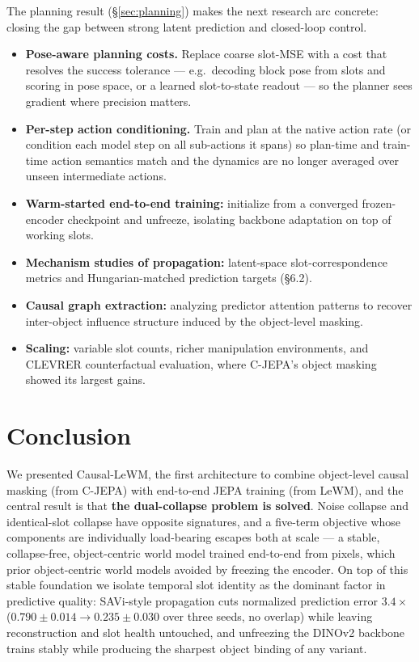 \documentclass[12pt]{article}
\begin{document}
The planning result (\S\ref{sec:planning}) makes the next research arc concrete: closing the gap between strong latent prediction and closed-loop control.
\begin{itemize}[leftmargin=*]
    \item \textbf{Pose-aware planning costs.} Replace coarse slot-MSE with a cost that resolves the success tolerance --- e.g.\ decoding block pose from slots and scoring in pose space, or a learned slot-to-state readout --- so the planner sees gradient where precision matters.
    \item \textbf{Per-step action conditioning.} Train and plan at the native action rate (or condition each model step on all sub-actions it spans) so plan-time and train-time action semantics match and the dynamics are no longer averaged over unseen intermediate actions.
    \item \textbf{Warm-started end-to-end training:} initialize from a converged frozen-encoder checkpoint and unfreeze, isolating backbone adaptation on top of working slots.
    \item \textbf{Mechanism studies of propagation:} latent-space slot-correspondence metrics and Hungarian-matched prediction targets (\S6.2).
    \item \textbf{Causal graph extraction:} analyzing predictor attention patterns to recover inter-object influence structure induced by the object-level masking.
    \item \textbf{Scaling:} variable slot counts, richer manipulation environments, and CLEVRER counterfactual evaluation, where C-JEPA's object masking showed its largest gains.
\end{itemize}

\section{Conclusion}

We presented Causal-LeWM, the first architecture to combine object-level causal masking (from C-JEPA) with end-to-end JEPA training (from LeWM), and the central result is that \textbf{the dual-collapse problem is solved}. Noise collapse and identical-slot collapse have opposite signatures, and a five-term objective whose components are individually load-bearing escapes both at scale --- a stable, collapse-free, object-centric world model trained end-to-end from pixels, which prior object-centric world models avoided by freezing the encoder. On top of this stable foundation we isolate temporal slot identity as the dominant factor in predictive quality: SAVi-style propagation cuts normalized prediction error $3.4\times$ ($0.790 \pm 0.014 \rightarrow 0.235 \pm 0.030$ over three seeds, no overlap) while leaving reconstruction and slot health untouched, and unfreezing the DINOv2 backbone trains stably while producing the sharpest object binding of any variant.
\end{document}
